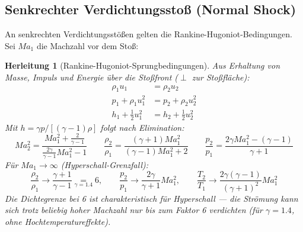 ﻿\documentclass[12pt,a4paper]{article}
\newtheorem{herleitung}{Herleitung}[section]
\newcommand{\Ma}{M\!a}
\begin{document}
\subsection{Senkrechter Verdichtungsstoß (Normal Shock)}

An senkrechten Verdichtungsstößen gelten die Rankine-Hugoniot-Bedingungen.
Sei $\Ma_1$ die Machzahl vor dem Stoß:

\begin{herleitung}[Rankine-Hugoniot-Sprungbedingungen]
Aus Erhaltung von Masse, Impuls und Energie über die Stoßfront ($\perp$ zur Stoßfläche):
\begin{align*}
  \rho_1 u_1 &= \rho_2 u_2 \tag{Masse}\\
  p_1 + \rho_1 u_1^2 &= p_2 + \rho_2 u_2^2 \tag{Impuls}\\
  h_1 + \tfrac{1}{2}u_1^2 &= h_2 + \tfrac{1}{2}u_2^2 \tag{Energie}
\end{align*}
Mit $h = \gamma p / [(\gamma-1)\rho]$ folgt nach Elimination:
\[
  \boxed{\Ma_2^2 = \frac{\Ma_1^2 + \frac{2}{\gamma-1}}{\frac{2\gamma}{\gamma-1}\Ma_1^2 - 1}}
  \qquad
  \frac{\rho_2}{\rho_1} = \frac{(\gamma+1)\Ma_1^2}{(\gamma-1)\Ma_1^2 + 2}
  \qquad
  \frac{p_2}{p_1} = \frac{2\gamma\Ma_1^2 - (\gamma-1)}{\gamma+1}
\]
Für $\Ma_1 \to \infty$ (Hyperschall-Grenzfall):
\[
  \frac{\rho_2}{\rho_1} \to \frac{\gamma+1}{\gamma-1}
    \underset{\gamma=1.4}{=} 6, \qquad
  \frac{p_2}{p_1} \to \frac{2\gamma}{\gamma+1}\Ma_1^2, \qquad
  \frac{T_2}{T_1} \to \frac{2\gamma(\gamma-1)}{(\gamma+1)^2}\Ma_1^2
\]
Die \emph{Dichtegrenze} bei 6 ist charakteristisch für Hyperschall --- die
Strömung kann sich trotz beliebig hoher Machzahl nur bis zum Faktor 6 verdichten
(für $\gamma = 1.4$, ohne Hochtemperatureffekte).
\end{herleitung}
\end{document}
